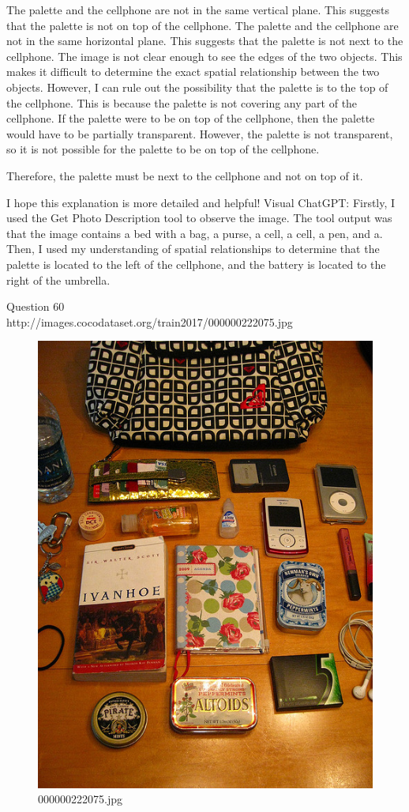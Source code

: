 \begin{enumerate}
    The palette and the cellphone are not in the same vertical plane. This suggests that the palette is not on top of the cellphone.
    The palette and the cellphone are not in the same horizontal plane. This suggests that the palette is not next to the cellphone.
    The image is not clear enough to see the edges of the two objects. This makes it difficult to determine the exact spatial relationship between the two objects.
    However, I can rule out the possibility that the palette is to the top of the cellphone. This is because the palette is not covering any part of the cellphone. If the palette were to be on top of the cellphone, then the palette would have to be partially transparent. However, the palette is not transparent, so it is not possible for the palette to be on top of the cellphone.
    
    Therefore, the palette must be next to the cellphone and not on top of it.
    
    I hope this explanation is more detailed and helpful!
    \subitem Visual ChatGPT: Firstly, I used the Get Photo Description tool to observe the image. The tool output was that the image contains a bed with a bag, a purse, a cell, a cell, a pen, and a. Then, I used my understanding of spatial relationships to determine that the palette is located to the left of the cellphone, and the battery is located to the right of the umbrella.
\end{enumerate}
Question 60\\
http://images.cocodataset.org/train2017/000000222075.jpg
\begin{figure}[h]
    \centering
    \includegraphics[width=0.8\linewidth]{../image set/hard/000000222075.jpg}
    \caption{000000222075.jpg}
\end{figure}
